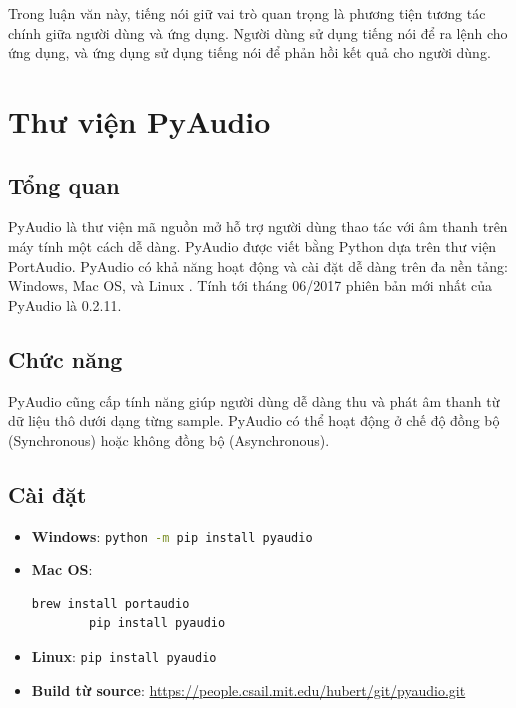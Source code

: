 Trong luận văn này, tiếng nói giữ vai trò quan trọng là phương tiện tương tác chính giữa người dùng và ứng dụng. Người dùng sử dụng tiếng nói để ra lệnh cho ứng dụng, và ứng dụng sử dụng tiếng nói để phản hồi kết quả cho người dùng.

\section{Thư viện PyAudio}
\subsection{Tổng quan}
PyAudio là thư viện mã nguồn mở hỗ trợ người dùng thao tác với âm thanh trên máy tính một cách dễ dàng. PyAudio được viết bằng Python dựa trên thư viện PortAudio. PyAudio có khả năng hoạt động và cài đặt dễ dàng trên đa nền tảng: Windows, Mac OS, và Linux . Tính tới tháng 06/2017 phiên bản mới nhất của PyAudio là 0.2.11.

\subsection{Chức năng}
PyAudio cũng cấp tính năng giúp người dùng dễ dàng thu và phát âm thanh từ dữ liệu thô dưới dạng từng sample. PyAudio có thể hoạt động ở chế độ đồng bộ (Synchronous) hoặc không đồng bộ (Asynchronous).

\subsection{Cài đặt}
\begin{itemize}
	\item \textbf{Windows}: \lstinline[language=bash]{python -m pip install pyaudio}
	\item \textbf{Mac OS}:  
		\begin{lstlisting}[language=bash]
		brew install portaudio
		pip install pyaudio
		\end{lstlisting}
	\item \textbf{Linux}: \lstinline[language=bash]{pip install pyaudio}
	\item \textbf{Build từ source}: \url{https://people.csail.mit.edu/hubert/git/pyaudio.git}
\end{itemize}

